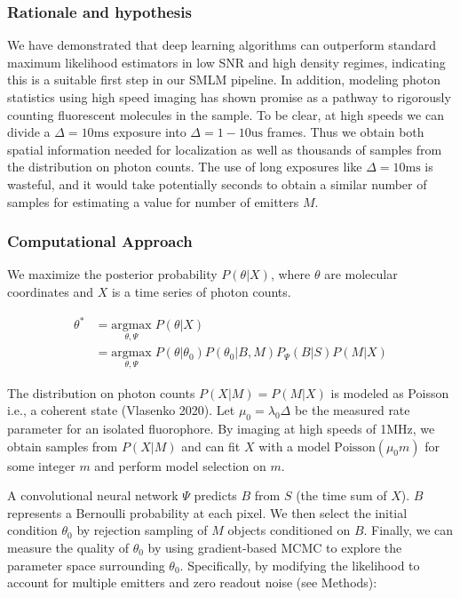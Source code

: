 \documentclass{ucetd}
\begin{document}
\subsubsection{Rationale and hypothesis}

We have demonstrated that deep learning algorithms can outperform standard maximum likelihood estimators in low SNR and high density regimes, indicating this is a suitable first step in our SMLM pipeline. In addition, modeling photon statistics using high speed imaging has shown promise as a pathway to rigorously counting fluorescent molecules in the sample. To be clear, at high speeds we can divide a $\Delta=10\mathrm{ms}$ exposure into $\Delta=1-10\mathrm{us}$ frames. Thus we obtain both spatial information needed for localization as well as thousands of samples from the distribution on photon counts. The use of long exposures like $\Delta=10\mathrm{ms}$ is wasteful, and it would take potentially seconds to obtain a similar number of samples for estimating a value for number of emitters $M$.

\subsubsection{Computational Approach}

We maximize the posterior probability $P(\theta|X)$, where $\theta$ are molecular coordinates and $X$ is a time series of photon counts.

\begin{align*}
\theta^{*} &= \underset{\theta,\Psi}{\mathrm{argmax}}\; P(\theta|X)\\
&= \underset{\theta,\Psi}{\mathrm{argmax}}\; P(\theta|\theta_{0})P(\theta_{0}|B,M)P_{\Psi}(B|S)P(M|X)
\end{align*}

The distribution on photon counts $P(X|M)=P(M|X)$ is modeled as Poisson i.e., a coherent state (Vlasenko 2020). Let $\mu_{0}=\lambda_{0}\Delta$ be the measured rate parameter for an isolated fluorophore. By imaging at high speeds of 1MHz, we obtain samples from $P(X|M)$ and can fit $X$ with a model $\mathrm{Poisson}(\mu_{0}m)$ for some integer $m$ and perform model selection on $m$.

A convolutional neural network $\Psi$ predicts $B$ from $S$ (the time sum of $X$). $B$ represents a Bernoulli probability at each pixel. We then select the initial condition $\theta_{0}$ by rejection sampling of $M$ objects conditioned on $B$. Finally, we can measure the quality of $\theta_{0}$ by using gradient-based MCMC to explore the parameter space surrounding $\theta_{0}$. Specifically, by modifying the likelihood to account for multiple emitters and zero readout noise (see Methods):
\end{document}

